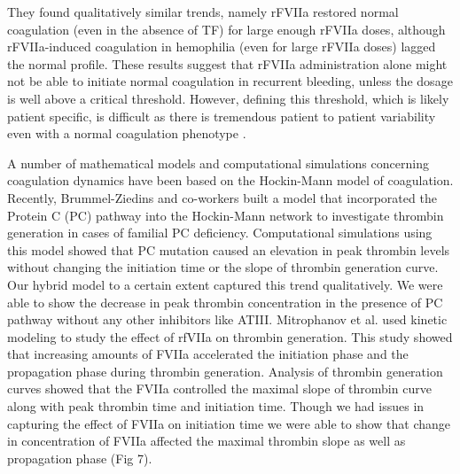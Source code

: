 \documentclass[processes,article,received,moreauthors,pdftex,12pt,a4paper]{mdpi}
\begin{document}
They found qualitatively similar trends, namely rFVIIa restored normal coagulation (even in the absence of TF) for large enough rFVIIa doses, although rFVIIa-induced coagulation 
in hemophilia (even for large rFVIIa doses) lagged the normal profile. 
These results suggest that rFVIIa administration alone
might not be able to initiate normal coagulation in recurrent bleeding, unless the dosage is well above a critical threshold.
However, defining this threshold, which is likely patient specific, is difficult as there is tremendous patient to patient variability even with a normal
coagulation phenotype \citep{Danforth:2012aa}. 

A number of mathematical models and computational simulations concerning coagulation dynamics have been based on the Hockin-Mann model of coagulation.  Recently, Brummel-Ziedins and co-workers built a model that incorporated the Protein C (PC) pathway into the Hockin-Mann network to investigate thrombin generation in cases of familial PC deficiency. Computational simulations using this model showed that PC mutation caused an elevation in peak thrombin levels without changing the initiation time or the slope of thrombin generation curve. Our hybrid model to a certain extent captured this trend qualitatively. We were able to show the decrease in peak thrombin concentration in the presence of PC pathway without any other inhibitors like ATIII. Mitrophanov et al. used kinetic modeling to study the effect of rfVIIa on thrombin generation. This study showed that increasing amounts of FVIIa accelerated the initiation phase and the propagation phase during thrombin generation. Analysis of thrombin generation curves showed that the FVIIa controlled the maximal slope of thrombin curve along with peak thrombin time and initiation time. Though we had issues in capturing the effect of FVIIa on initiation time we were able to show that change in concentration of FVIIa affected the maximal thrombin slope as well as propagation phase (Fig 7).
\end{document}
